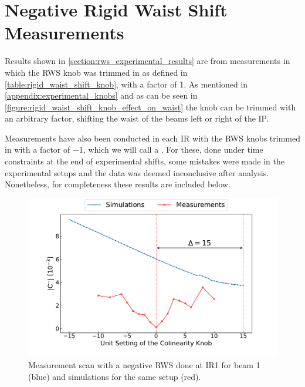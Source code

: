 \chapter{Negative Rigid Waist Shift Measurements}
\label{appendix:inconclusive_measurements}

Results shown in \cref{section:rws_experimental_results} are from measurements in which the \gls{RWS} \gls{knob} was trimmed in as defined in \cref{table:rigid_waist_shift_knob}, with a factor of \num{1}.
As mentioned in \cref{appendix:experimental_knobs} and as can be seen in \cref{figure:rigid_waist_shift_knob_effect_on_waist} the knob can be trimmed with an arbitrary factor, shifting the waist of the beams left or right of the \acrshort{IP}. 

Measurements have also been conducted in each \gls{IR} with the \gls{RWS} knobs trimmed in with a factor of \num{-1}, which we will call a .
For these, done under time constraints at the end of experimental shifts, some mistakes were made in the experimental setups and the data was deemed inconclusive after analysis.
Nonetheless, for completeness these results are included below.

\begin{figure}[!htb]
    \centering
    \includegraphics*[width=\textwidth]{Figures/Appendices/rws_measurement_ir1_b1_neg.pdf}
    \caption{Measurement scan with a negative RWS done at IR\num{1} for beam \num{1} (\textcolor{mplblue}{blue}) and simulations for the same setup (\textcolor{mplr}{red}). }
    \label{figure:ir1_b1_neg_measurement}
\end{figure}

